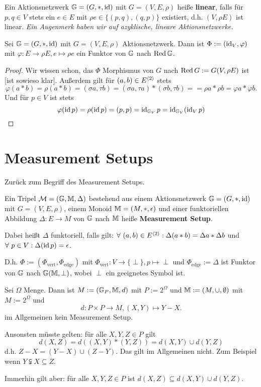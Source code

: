 \begin{definition}
    Ein Aktionsnetzwerk $\mathbb{G} =(G, \ast, \operatorname{id})$ mit $G =(V,E,\rho)$ heiße \textbf{linear}, falls für $p,q \in V$ stets ein $e \in E$ mit
    $\rho e \in \{(p,q),(q,p)\}$ existiert, d.h. $(V,\rho E)$ ist linear.
    \textit{Ein Augenmerk haben wir auf azyklische, lineare Aktionsnetzwerke.}
\end{definition}

\begin{proposition}
    Sei $\mathbb{G} = (G, \ast, \operatorname{id})$ mit $G=(V, E,\rho)$ Aktionsnetzwerk.
    Dann ist $\Phi := (\operatorname{id}_V, \varphi)$ mit $\varphi: E \to \rho E, e\mapsto \rho e$ ein Funktor von
    $\mathbb{G}$ nach $\operatorname{Red} \mathbb{G}$.
\end{proposition}
\begin{proof}
    Wir wissen schon, das $\Phi$ Morphismus von $G$ nach $\operatorname{Red} G := G(V, \rho E)$ ist [ist sowieso klar].
    Außerdem gilt für $(a,b) \in E^{\langle2\rangle}$ stets 
    $$ \varphi(a \ast b) = \rho (a\ast b) = (\sigma a, \tau b) = (\sigma a, \tau a) \ast (\sigma b, \tau b) = 
    = \rho a \ast \rho b = \varphi a \ast \varphi b.$$ 
    Und für $p \in V$ ist stets 
    $$ \varphi (\operatorname{id} p) = \rho(\operatorname{id} p) = (p,p)=\operatorname{id}_{\mathbb{G}_V}p = \operatorname{id}_{\mathbb{G}_V} (\operatorname{id}_V p)$$
\end{proof}

\section{Measurement Setups}
\newcommand*{\Meas}{\mathcal{M}}
Zurück zum Begriff des Measurement Setups.
\begin{definition}
    Ein Tripel $\mathcal{M} =(\mathbb{G}, \mathbb{M}, \Delta)$ bestehend aus einem Aktionsnetzwerk $\mathbb{G} = (G, \ast, \operatorname{id})$ mit $G =(V,E,\rho)$, einem Monoid 
    $\mathbb{M} = (M, \ast, \epsilon)$ und einer funktoriellen Abbildung $\Delta: E \to M$ von $\mathbb{G}$ nach $\mathbb{M}$ heiße \textbf{Measurement Setup}.

    Dabei heißt $\Delta$ funktoriell, falls gilt: $\forall~(a,b)\in E^{\langle2\rangle} : \Delta (a\ast b) = \Delta a \ast \Delta b$ und
    $\forall~p\in V: \Delta (\operatorname{id} p) = \epsilon$.

    D.h. $\Phi := (\Phi_{\text{vert}}, \Phi_{\text{edge}})$ mit $\Phi_{\text{vert}}: V \to \{\perp\}, p \mapsto \perp$ und
    $\Phi_{\text{edge}} := \Delta$ ist Funktor von $\mathbb{G}$ nach $\mathbb{G}(\mathbb{M},\perp)$, wobei $\perp$ ein geeignetes Symbol ist.
\end{definition}

\begin{beispiel}[Gegenbeispiel]
    Sei $\Omega$ Menge. Dann ist $M:=(\mathbb{G}_P, \mathbb{M}, d)$ mit $P := 2^\Omega$ und $\mathbb{M} := (M, \cup, \emptyset)$ mit $M := 2^\Omega$ und
    $$ d: P \times P \to M, (X,Y) \mapsto Y - X. $$ im Allgemeinen kein Measurement Setup.
    
    Ansonsten müsste gelten: für alle $X,Y,Z \in P$ gilt $$d(X,Z) = d((X,Y) \ast (Y,Z)) = d(X,Y) \cup d(Y,Z)$$
    d.h. $Z-X = (Y-X)\cup (Z-Y)$.
    Das gilt im Allgemeinen nicht. Zum Beispiel wenn $Y \subsetneqq X \subseteq Z$.

    Immerhin gilt aber: für alle $X,Y,Z \in P$ ist $d(X,Z) \subseteq d(X,Y) \cup d(Y,Z)$.
\end{beispiel}

